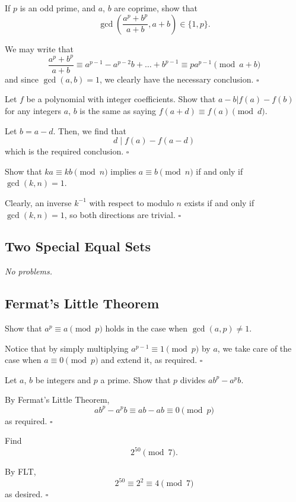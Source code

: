 \documentclass{article}
\newcommand{\noproblems}{\emph{No problems.}}
\begin{document}
\begin{problem}[2.4.6]{}
If $p$ is an odd prime, and $a$, $b$ are coprime, show that \[\gcd\left(\dfrac{a^p + b^p}{a + b}, a + b\right) \in \{1, p\}.\]
\end{problem}
We may write that \[\dfrac{a^p+b^p}{a+b} \equiv a^{p-1}-a^{p-2}b+\dots+b^{p-1} \equiv pa^{p-1} \pmod{a+b}\] and since $\gcd(a, b) = 1$, we clearly have the necessary conclusion. $\square$

\begin{problem}[2.4.7]{}
Let $f$ be a polynomial with integer coefficients. Show that $a - b | f(a) - f(b)$ for any integers $a$, $b$ is the same as saying $f(a + d) \equiv f(a) \pmod{d}$.
\end{problem}
Let $b = a-d$. Then, we find that \[d \mid f(a)-f(a-d)\] which is the required conclusion. $\square$

\begin{problem}[2.4.8]{}
Show that $ka \equiv kb \pmod{n}$ implies $a \equiv b \pmod{n}$ if and only if $\gcd(k, n) = 1$.
\end{problem}
Clearly, an inverse $k^{-1}$ with respect to modulo $n$ exists if and only if $\gcd(k, n) = 1$, so both directions are trivial. $\square$

\subsection{Two Special Equal Sets}

\noproblems

\subsection{Fermat's Little Theorem}

\begin{problem}[2.6.1]{}
Show that $a^p \equiv a \pmod{p}$ holds in the case when $\gcd(a, p) \neq 1$.
\end{problem}
Notice that by simply multiplying $a^{p-1} \equiv 1 \pmod{p}$ by $a$, we take care of the case when $a \equiv 0\pmod{p}$ and extend it, as required. $\square$

\begin{problem}[2.6.2]{}
Let $a$, $b$ be integers and $p$ a prime. Show that $p$ divides $ab^p - a^pb$.
\end{problem}
By Fermat's Little Theorem, \[ab^p-a^pb \equiv ab-ab \equiv 0 \pmod{p}\] as required. $\square$

\begin{problem}[2.6.3]{}
Find \[2^{50} \pmod{7}.\]
\end{problem}
By FLT, \[2^{50} \equiv 2^2 \equiv 4 \pmod{7}\] as desired. $\square$
\end{document}
